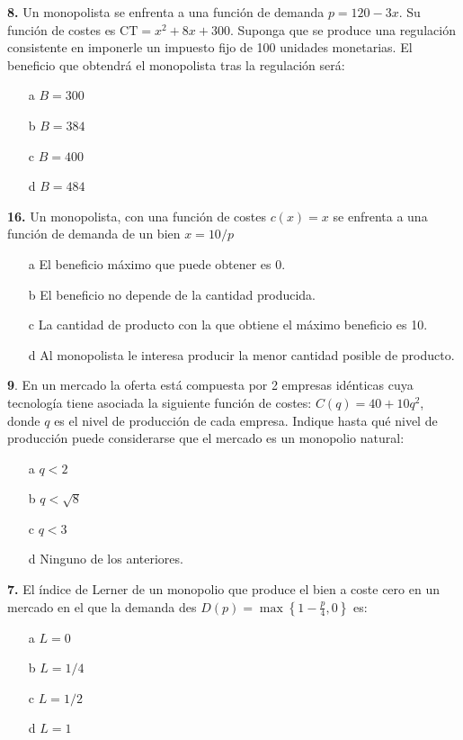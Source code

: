 \documentclass{nuevotema}
\begin{document}
\textbf{8.} Un monopolista se enfrenta a una función de demanda $p=120-3x$. Su función de costes es $\text{CT}=x^2 + 8x + 300$. Suponga que se produce una regulación consistente en imponerle un impuesto fijo de 100 unidades monetarias. El beneficio que obtendrá el monopolista tras la regulación será:

\begin{itemize}
	\item[a] $B=300$
	\item[b] $B=384$
	\item[c] $B=400$
	\item[d] $B=484$
\end{itemize}


\textbf{16.} Un monopolista, con una función de costes $c(x) = x$ se enfrenta a una función de demanda de un bien $x=10/p$
\begin{enumerate}
	\item[a] El beneficio máximo que puede obtener es 0.
	\item[b] El beneficio no depende de la cantidad producida.
	\item[c] La cantidad de producto con la que obtiene el máximo beneficio es 10.
	\item[d] Al monopolista le interesa producir la menor cantidad posible de producto.
\end{enumerate}

\textbf{9}. En un mercado la oferta está compuesta por 2 empresas idénticas cuya tecnología tiene asociada la siguiente función de costes: $C(q) = 40 + 10 q^2$, donde $q$ es el nivel de producción de cada empresa. Indique hasta qué nivel de producción puede considerarse que el mercado es un monopolio natural: 

\begin{enumerate}
	\item[a] $q<2$
	\item[b] $q<\sqrt{8}$
	\item[c] $q < 3$
	\item[d] Ninguno de los anteriores.
\end{enumerate}


\textbf{7.} El índice de Lerner de un monopolio que produce el bien a coste cero en un mercado en el que la demanda des $D(p) = \max \left\lbrace 1 - \frac{p}{4}, 0 \right\rbrace$ es:
\begin{enumerate}
	\item[a] $L = 0$
	\item[b] $L = 1/4$
	\item[c] $L = 1/2$
	\item[d] $L = 1$
\end{enumerate}
\end{document}
